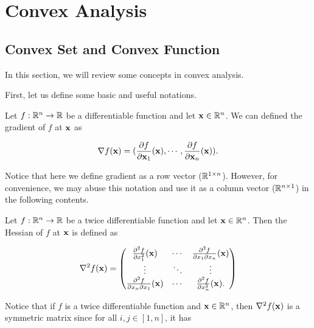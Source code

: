 \documentclass[main.tex]{subfiles}
\begin{document}
\chapter{Convex Analysis}

\section{Convex Set and Convex Function}
In this section, we will review some concepts in convex analysis.

First, let us define some basic and useful notations.

\begin{definition}
	Let $f: \mathbb{R}^n \to \mathbb{R}$ be a differentiable function and let $\mathbf{x} \in \mathbb{R}^n$. We can defined the gradient of $f$ at $\mathbf{x}$ as 
	
	\begin{equation}
	\nabla f(\mathbf{x}) = (\frac{\partial f}{\partial \mathbf{x}_1} (\mathbf{x}), \cdots, \frac{\partial f}{\partial \mathbf{x}_n} (\mathbf{x})).
	\end{equation}
\end{definition}

\begin{remark}
	Notice that here we define gradient as a row vector ($\mathbb{R}^{1\times n}$). However, for convenience, we may abuse this notation and use it as a column vector ($\mathbb{R}^{n\times 1}$) in the following contents.
\end{remark}
\begin{definition}
	Let $f:\mathbb{R}^n \to \mathbb{R}$ be a twice differentiable function and let $\mathbf{x} \in \mathbb{R}^n$. Then the Hessian of $f$ at $\mathbf{x}$ is defined as
	
	\begin{equation}
	\nabla^2 f(\mathbf{x}) = 
	\begin{pmatrix} 
	\frac{\partial ^2 f}{\partial x_1^2} (\mathbf{x}) & \cdots  & \frac{\partial ^2 f}{\partial x_1 \partial x_n} (\mathbf{x}) \\
	\vdots & \ddots & \vdots \\
	\frac{\partial ^2 f}{\partial x_n \partial x_1} (\mathbf{x}) & \cdots  & \frac{\partial ^2 f}{ \partial x_n^2} (\mathbf{x}).
	\end{pmatrix}
	\end{equation}
	
\end{definition}

Notice that if $f$ is a twice differentiable function and $\mathbf{x} \in \mathbb{R}^n$, then $\nabla^2 f(\mathbf{x})$ is a symmetric matrix since for all $i, j \in [1, n]$, it has
\end{document}
